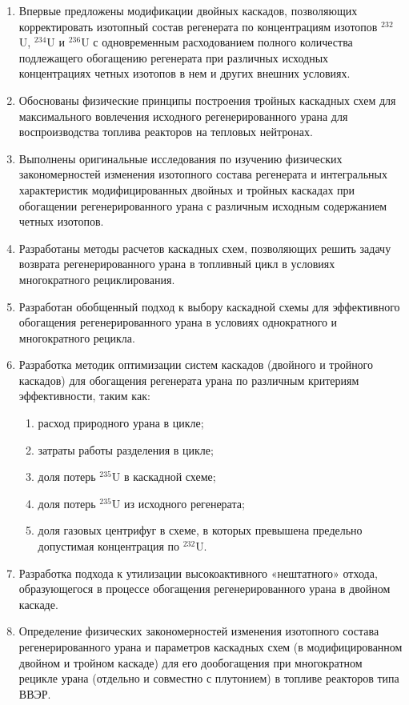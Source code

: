 {\novelty}
\begin{enumerate}
  \item Впервые предложены модификации двойных каскадов, позволяющих корректировать
  изотопный состав регенерата по концентрациям изотопов $^{232}$U, $^{234}$U и $^{236}$U с одновременным расходованием полного количества подлежащего обогащению регенерата при различных исходных концентрациях четных изотопов в нем и других внешних условиях.
  \item Обоснованы физические принципы построения тройных каскадных схем для максимального вовлечения исходного регенерированного урана для воспроизводства топлива реакторов на тепловых нейтронах.
  \item Выполнены оригинальные исследования по изучению физических закономерностей изменения изотопного состава регенерата и интегральных характеристик модифицированных двойных и тройных каскадах при обогащении регенерированного урана с различным исходным содержанием четных изотопов.
  \item Разработаны методы расчетов каскадных схем, позволяющих решить задачу возврата регенерированного урана в топливный цикл в условиях многократного рециклирования.
  \item Разработан обобщенный подход к выбору каскадной схемы для эффективного обогащения регенерированного урана в условиях однократного и многократного рецикла.
  \item Разработка методик оптимизации систем каскадов (двойного и тройного каскадов) для обогащения регенерата урана по различным критериям эффективности, таким как:
  \begin{enumerate}
    \item расход природного урана в цикле;
    \item затраты работы разделения в цикле;
    \item доля потерь $^{235}$U в каскадной схеме;
    \item доля потерь $^{235}$U из исходного регенерата;
    \item доля газовых центрифуг в схеме, в которых превышена предельно допустимая концентрация по $^{232}$U.
  \end{enumerate}
  \item Разработка подхода к утилизации высокоактивного «нештатного» отхода, образующегося в процессе обогащения регенерированного урана в двойном каскаде.
  \item Определение физических закономерностей изменения изотопного состава регенерированного урана и параметров каскадных схем (в модифицированном двойном и тройном каскаде) для его дообогащения при многократном рецикле урана (отдельно и совместно с плутонием) в топливе реакторов типа ВВЭР.
\end{enumerate}

